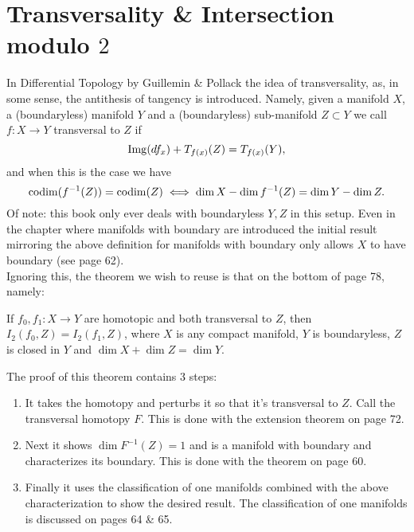 \documentclass{article}
\DeclareMathOperator{\codim}{\mathrm{codim}}
\begin{document}
\section{Transversality \& Intersection modulo $2$}%
In Differential Topology by Guillemin \& Pollack the idea of transversality, as, in some sense, the antithesis of tangency is introduced. Namely, given a manifold $X$, a (boundaryless) manifold $Y$ and a (boundaryless) sub-manifold $Z \subset Y$ we call $f : X \to Y$ transversal to $Z$ if
$$
\mathrm{Img}(d f_x) + T_{f(x)}(Z) = T_{f(x)}(Y),
$$
and when this is the case we have
$$
\codim\parens{f^{-1}(Z)} = \codim(Z) \iff \dim X - \dim f^{-1}(Z) = \dim Y - \dim Z.
$$
Of note: this book only ever deals with boundaryless $Y, Z$ in this setup. Even in the chapter where manifolds with boundary are introduced the initial result mirroring the above definition for manifolds with boundary only allows $X$ to have boundary (see page 62).
\,\\
Ignoring this, the theorem we wish to reuse is that on the bottom of page 78, namely:
\begin{theorem}
  If $f_0, f_1 : X \to Y$ are homotopic and both transversal to $Z$, then $I_2(f_0, Z) = I_2(f_1, Z)$, where $X$ is any compact manifold, $Y$ is boundaryless, $Z$ is closed in $Y$ and $\dim X + \dim Z = \dim Y$.
\end{theorem}
The proof of this theorem contains 3 steps:
\begin{enumerate}
  \item It takes the homotopy and perturbs it so that it's transversal to $Z$. Call the transversal homotopy $F$. This is done with the extension theorem on page 72.
  \item Next it shows $\dim F^{-1}(Z) = 1$ and is a manifold with boundary and characterizes its boundary. This is done with the theorem on page 60.
  \item Finally it uses the classification of one manifolds combined with the above characterization to show the desired result. The classification of one manifolds is discussed on pages 64 \& 65.
\end{enumerate}
\end{document}
